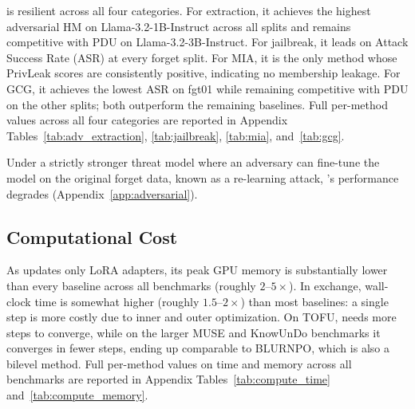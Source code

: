 \method is resilient across all four categories.
For extraction, it achieves the highest adversarial HM on Llama-3.2-1B-Instruct across all splits and remains competitive with PDU on Llama-3.2-3B-Instruct.
For jailbreak, it leads on Attack Success Rate (ASR) at every forget split.
For MIA, it is the only method whose PrivLeak scores are consistently positive, indicating no membership leakage.
For GCG, it achieves the lowest ASR on fgt01 while remaining competitive with PDU on the other splits; both outperform the remaining baselines.
Full per-method values across all four categories are reported in Appendix Tables~\ref{tab:adv_extraction}, \ref{tab:jailbreak}, \ref{tab:mia}, and~\ref{tab:gcg}.

Under a strictly stronger threat model where an adversary can fine-tune the model on the original forget data, known as a re-learning attack, \method's performance degrades (Appendix~\ref{app:adversarial}).


\subsection{Computational Cost}
\label{sec:compute}

As \method updates only LoRA adapters, its peak GPU memory is substantially lower than every baseline across all benchmarks (roughly $2$--$5\times$).
In exchange, wall-clock time is somewhat higher (roughly $1.5$--$2\times$) than most baselines: a single \method step is more costly due to inner and outer optimization. On TOFU, \method needs more steps to converge, while on the larger MUSE and KnowUnDo benchmarks it converges in fewer steps, ending up comparable to BLURNPO, which is also a bilevel method.
Full per-method values on time and memory across all benchmarks are reported in Appendix Tables~\ref{tab:compute_time} and~\ref{tab:compute_memory}.

